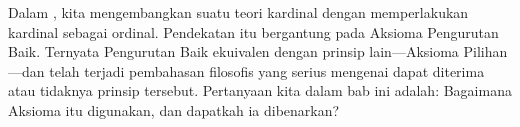 \documentclass[../../../include/open-logic-section]{subfiles}
\begin{document}


Dalam , kita
mengembangkan suatu teori kardinal dengan memperlakukan kardinal sebagai
ordinal. Pendekatan itu bergantung pada Aksioma Pengurutan Baik. Ternyata
Pengurutan Baik ekuivalen dengan prinsip lain---Aksioma Pilihan---dan telah
terjadi pembahasan filosofis yang serius mengenai dapat diterima atau
tidaknya prinsip tersebut. Pertanyaan kita dalam bab ini adalah: Bagaimana
Aksioma itu digunakan, dan dapatkah ia dibenarkan?
\end{document}

